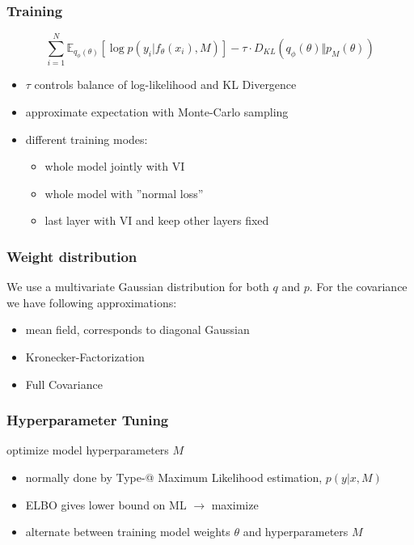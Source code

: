 \documentclass{beamer}
\makeatletter
\newcommand*{\rom}[1]{\expandafter\@slowromancap\romannumeral #1@}
\makeatother
\begin{document}
        \begin{frame}
            \frametitle{Training}
            \begin{equation*}
                \sum_{i=1}^N \mathbb{E}_{q_{\phi}(\theta)}[\log{p(y_i \vert f_{\theta}(x_i), M)}] - \tau \cdot D_{KL}(q_{\phi}(\theta) \Vert p_{M}(\theta))
            \end{equation*}
            \begin{itemize}
                \item $\tau$ controls balance of log-likelihood and KL Divergence
                \item approximate expectation with Monte-Carlo sampling
                \item different training modes:
                    \begin{itemize}
                        \item whole model jointly with VI
                        \item whole model with ''normal loss''
                        \item last layer with VI and keep other layers fixed
                    \end{itemize}
            \end{itemize}
        \end{frame}

        \begin{frame}
            \frametitle{Weight distribution}
            We use a multivariate Gaussian distribution for both $q$ and $p$.
            For the covariance we have following approximations:
            \begin{itemize}
                \item mean field, corresponds to diagonal Gaussian
                \item Kronecker-Factorization
                \item Full Covariance
            \end{itemize}
        \end{frame}


        \begin{frame}
            \frametitle{Hyperparameter Tuning}
            optimize model hyperparameters $M$
            \begin{itemize}
                \item normally done by Type-\rom{2} Maximum Likelihood estimation, $p(y \vert x, M)$
                \item ELBO gives lower bound on ML $\rightarrow$ maximize
                \item alternate between training model weights $\theta$ and hyperparameters $M$
            \end{itemize}

        \end{frame}
\end{document}
